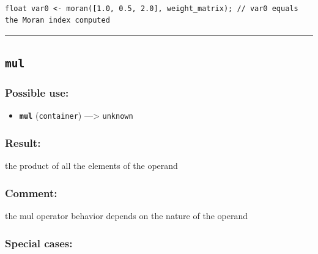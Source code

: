 \documentclass[]{book}
\providecommand{\tightlist}{%
  \setlength{\itemsep}{0pt}\setlength{\parskip}{0pt}}
\theoremstyle{definition}
\theoremstyle{definition}
\theoremstyle{definition}
\theoremstyle{remark}
\begin{document}
\begin{verbatim}
 
float var0 <- moran([1.0, 0.5, 2.0], weight_matrix); // var0 equals the Moran index computed
\end{verbatim}

\begin{center}\rule{0.5\linewidth}{\linethickness}\end{center}

\subsection{\texorpdfstring{\texttt{mul}}{mul}}\label{mul}

\subsubsection{Possible use:}\label{possible-use-364}

\begin{itemize}
\tightlist
\item
  \textbf{\texttt{mul}} (\texttt{container}) ---\textgreater{}
  \texttt{unknown}
\end{itemize}

\subsubsection{Result:}\label{result-352}

the product of all the elements of the operand

\subsubsection{Comment:}\label{comment-72}

the mul operator behavior depends on the nature of the operand

\subsubsection{Special cases:}\label{special-cases-102}
\end{document}
